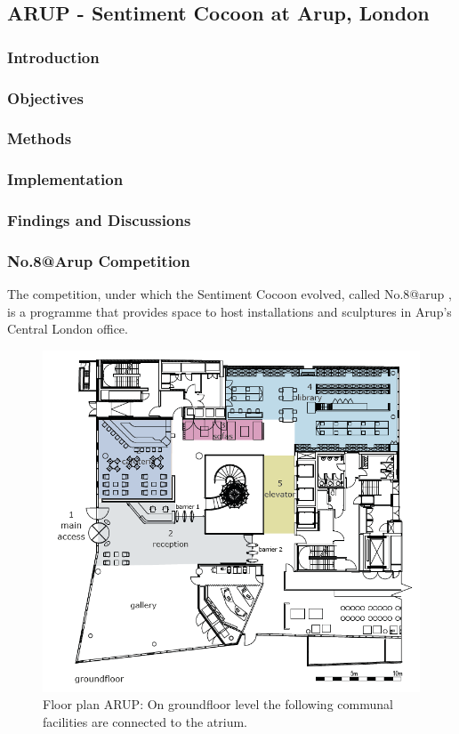 \subsection{ARUP - Sentiment Cocoon at Arup, London}


\subsubsection {Introduction} 
\subsubsection {Objectives} 
\subsubsection {Methods}
\subsubsection {Implementation}
\subsubsection {Findings and Discussions}


\subsubsection{No.8@Arup Competition}

The competition, under which the Sentiment Cocoon evolved, called No.8@arup , is a programme that provides space to host installations and sculptures in Arup’s Central London office. 

\begin{figure}[!h] 
\centering
\includegraphics[width=\textwidth]{Illustrations/ARUPfloorplan.png}
\caption [Floor plan ARUP] {Floor plan ARUP: On groundfloor level the following communal facilities are connected to the atrium.}
\label{ARUPfloorplan}
\end{figure}

